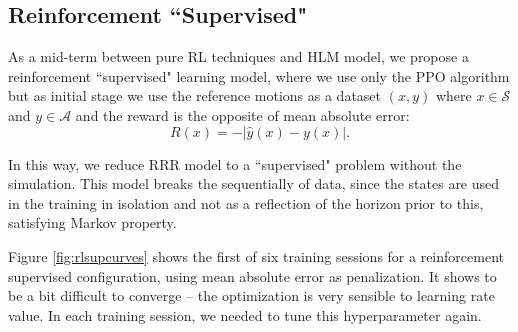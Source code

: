 



\subsection{Reinforcement ``Supervised"}\label{sec:suprl}

As a mid-term between pure RL techniques and HLM model, we propose a reinforcement ``supervised" learning model, where we use only the PPO algorithm but as initial stage we use the reference motions as a dataset $(x, y)$ where $x \in \mathcal{S}$ and $y \in \mathcal{A}$ and the reward is the opposite of mean absolute error:
\begin{equation}
R(x) = - \lvert \hat y(x) - y(x) \rvert.
\end{equation}

 In this way, we reduce RRR model to a ``supervised" problem without the simulation. This model breaks the sequentially of data, since the states are used in the training in isolation and not as a reflection of the horizon prior to this, satisfying Markov property.

Figure \ref{fig:rlsupcurves} shows the first of six training sessions for a reinforcement supervised configuration, using mean absolute error as penalization. It shows to be a bit difficult to converge -- the optimization is very sensible to learning rate value. In each training session, we needed to tune this hyperparameter again.

